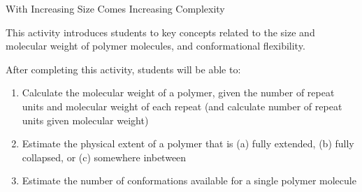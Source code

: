 %
%
%
%

\renewcommand{\figpath}{content/intro/size-and-complexity/figs}
\renewcommand{\labelbase}{size-and-complexity}

\begin{activity}{With Increasing Size Comes Increasing Complexity}
\label{\labelbase}

\begin{instructornotes}

	This activity introduces students to key concepts related to the size and molecular weight of polymer molecules, and conformational flexibility.
	
	After completing this activity, students will be able to:
			\begin{enumerate}
				\item Calculate the molecular weight of a polymer, given the number of repeat units and molecular weight of each repeat (and calculate number of repeat units given molecular weight)
				\item Estimate the physical extent of a polymer that is (a) fully extended, (b) fully collapsed, or (c) somewhere inbetween
				\item Estimate the number of conformations available for a single polymer molecule
			\end{enumerate}
			

\end{instructornotes}
\end{activity}
